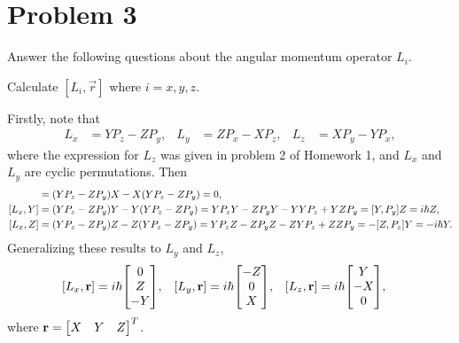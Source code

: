 \newcommand{\vr}{\vec{r}}

\newcommand{\Li}{L_i}
\newcommand{\Lx}{L_x}
\newcommand{\Ly}{L_y}
\newcommand{\Lz}{L_z}
\newcommand{\Lw}{L^2}

\newcommand{\Px}{P_x}
\newcommand{\Py}{P_y}
\newcommand{\Pz}{P_z}

\newcommand{\Ri}{R_i}
\newcommand{\Rx}{R_x}
\newcommand{\Ry}{R_y}
\newcommand{\Rz}{R_z}

\newcommand{\Rit}{\Ri(\theta)}
\newcommand{\Rxt}{\Rx(\theta)}
\newcommand{\Ryt}{\Ry(\theta)}
\newcommand{\Rzt}{\Rz(\theta)}

\newcommand{\cost}{\cos{\theta}}
\newcommand{\sint}{\sin{\theta}}

\newcommand{\Mi}{M_i}
\newcommand{\Mx}{M_x}
\newcommand{\My}{M_y}
\newcommand{\Mz}{M_z}

\newcommand{\Jpm}{J_\pm}
\newcommand{\Jp}{J_+}
\newcommand{\Jm}{J_-}

\newcommand{\veps}{\varepsilon}
\newcommand{\hbsqt}{\frac{\hbar}{\sqrt{2}}}

\section{Problem 3}
\begin{statement}
	Answer the following questions about the angular momentum operator $\Li$.
\end{statement}

\begin{problem}
	Calculate $[\Li, \vr]$ where $i = x, y, z$.
\end{problem}

\begin{solution}
	Firstly, note that
	\begin{align*}
		\Lx &= Y \Pz - Z \Py, &
		\Ly &= Z \Px - X \Pz, &
		\Lz &= X \Py - Y \Px,
	\end{align*}
	where the expression for $\Lz$ was given in problem 2 of Homework 1, and $\Lx$ and $\Ly$ are cyclic permutations.  Then
	\begin{align*}
		[\Lx, X] &= (Y \Pz - Z \Py) X - X (Y \Pz - Z \Py) = 0, \\
		[\Lx, Y] &= (Y \Pz - Z \Py) Y - Y (Y \Pz - Z \Py) = Y \Pz Y - Z \Py Y - Y Y \Pz + Y Z \Py = [Y, \Py] Z = \ihb Z, \\
		[\Lx, Z] &= (Y \Pz - Z \Py) Z - Z (Y \Pz - Z \Py) = Y \Pz Z - Z \Py Z - Z Y \Pz + Z Z \Py = -[Z, \Pz] Y = -\ihb Y.
	\end{align*}
	Generalizing these results to $\Ly$ and $\Lz$,
	\begin{align} \label{mats}
		[\Lx, \vr] &= \ihb \mqty[ 0 \\ Z \\ -Y ], &
		[\Ly, \vr] &= \ihb \mqty[ -Z \\ 0 \\ X ], &
		[\Lz, \vr] &= \ihb \mqty[ Y \\ -X \\ 0 ],
	\end{align}
	where $\vr = \mqty[X & Y & Z]^T$.
\end{solution}

